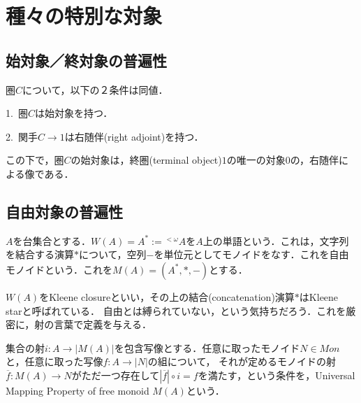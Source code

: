 \documentclass[uplatex, 12pt, dvipdfmx]{jsreport}
\begin{document}
\section{種々の特別な対象}

\subsection{始対象／終対象の普遍性}

\begin{proposition}[始対象を持つ圏の特徴付け]\rm{}
    圏$C$について，以下の２条件は同値．
    
    1.\, 圏$C$は始対象を持つ．

    2.\, 関手$C\to 1$は右随伴(right adjoint)を持つ．
\end{proposition}
この下で，圏$C$の始対象は，終圏(terminal object)$1$の唯一の対象$0$の，右随伴による像である．

\subsection{自由対象の普遍性}

\begin{definition}[自由モノイド]\label{def-free_monoid}
    $A$を台集合とする．$W(A)=A^*:={}^{<\omega}\!A$を$A$上の単語という．これは，文字列を結合する演算$*$について，空列$-$を単位元としてモノイドをなす．これを自由モノイドという．これを$M(A)=(A^*,*,-)$とする．
\end{definition}
$W(A)$をKleene closureといい，その上の結合(concatenation)演算$*$はKleene starと呼ばれている．
自由とは縛られていない，という気持ちだろう．これを厳密に，射の言葉で定義を与える．

\begin{definition}\rm{}
    集合の射$i:A\to |M(A)|$を包含写像とする．任意に取ったモノイド$N\in Mon$と，任意に取った写像$f:A\to |N|$の組について，
    それが定めるモノイドの射$\overline{f}:M(A)\to N$がただ一つ存在して$|\overline{f}|\circ i=f$を満たす，という条件を，Universal Mapping Property of free monoid $M(A)$という．
    \begin{center}\end{center}
\end{definition}
\end{document}
